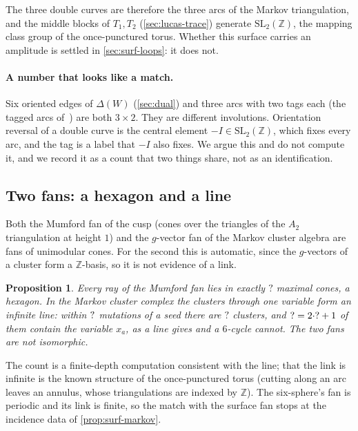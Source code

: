 \documentclass[11pt,a4paper]{article}
\newcommand{\SSSfLinkClusters}{?}\newcommand{\SSSfLinkThrough}{?}
\newcommand{\SSSfHexCones}{?}\newcommand{\SSSfLucasN}{?}\newcommand{\SSSfHatX}{?}
\newcommand{\ZZ}{\mathbb{Z}}
\newcommand{\SL}{\mathrm{SL}}
\theoremstyle{plain}
\newtheorem{proposition}{Proposition}
\theoremstyle{definition}
\begin{document}
The three double curves are therefore the three arcs of the Markov triangulation, and the middle blocks of $T_1,T_2$ (\cref{sec:lucas-trace}) generate
$\SL_2(\ZZ)$, the mapping class group of the once-punctured torus. Whether this surface carries an amplitude is settled in \cref{sec:surf-loops}: it does not.

\paragraph{A number that looks like a match.} Six oriented edges of $\Delta(W)$ (\cref{sec:dual}) and three arcs with two tags each (the tagged arcs of~\cite{FST}) are both
$3\times2$. They are different involutions. Orientation reversal of a double curve is the central element $-I\in\SL_2(\ZZ)$, which fixes every arc, and
the tag is a label that $-I$ also fixes. We argue this and do not compute it, and we record it as a count that two things share, not as an identification.

\subsection{Two fans: a hexagon and a line}

Both the Mumford fan of the cusp (cones over the triangles of the $A_2$ triangulation at height $1$) and the $g$-vector fan of the Markov
cluster algebra are fans of unimodular cones. For the second this is automatic, since the $g$-vectors of a cluster form a $\ZZ$-basis, so it is not evidence of a link.

\begin{proposition}
\label{prop:surf-fans}
Every ray of the Mumford fan lies in exactly $\SSSfHexCones$ maximal cones, a hexagon. In the Markov cluster complex the clusters through one variable form an
infinite line: within $?$ mutations of a seed there are $\SSSfLinkClusters$ clusters, and $\SSSfLinkThrough=2\cdot\SSSfLinkDepth+1$ of them contain the
variable $x_a$, as a line gives and a $6$-cycle cannot. The two fans are not isomorphic.
\end{proposition}

The count is a finite-depth computation consistent with the line; that the link is infinite is the known structure of the once-punctured torus (cutting along an arc leaves an annulus, whose triangulations are indexed by $\ZZ$).
The six-sphere's fan is periodic and its link is finite, so the match with the surface fan stops at the incidence data of \cref{prop:surf-markov}.
\end{document}
